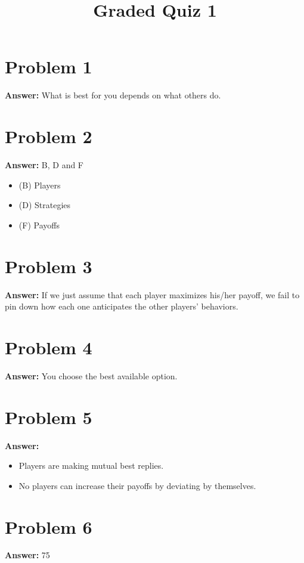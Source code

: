 \documentclass[11pt]{article}
\date{}
\title{Graded Quiz 1}
\begin{document}
\thispagestyle{empty}
\pagestyle{empty}
\section*{Problem 1}
\label{sec:org2e8e549}

\textbf{Answer:} What is best for you depends on what others do.
\section*{Problem 2}
\label{sec:orgaebf19e}

\textbf{Answer:} B, D and F
\begin{itemize}
\item (B) Players
\item (D) Strategies
\item (F) Payoffs
\end{itemize}
\section*{Problem 3}
\label{sec:org96ca7a2}

\textbf{Answer:} If we just assume that each player maximizes his/her payoff, we fail
to pin down how each one anticipates the other players' behaviors.
\section*{Problem 4}
\label{sec:org3e207bb}

\textbf{Answer:} You choose the best available option.
\section*{Problem 5}
\label{sec:org6f4a6c8}

\textbf{Answer:}
\begin{itemize}
\item Players are making mutual best replies.
\item No players can increase their payoffs by deviating by themselves.
\end{itemize}
\section*{Problem 6}
\label{sec:org8b91f10}

\textbf{Answer:} 75\\
\end{document}
